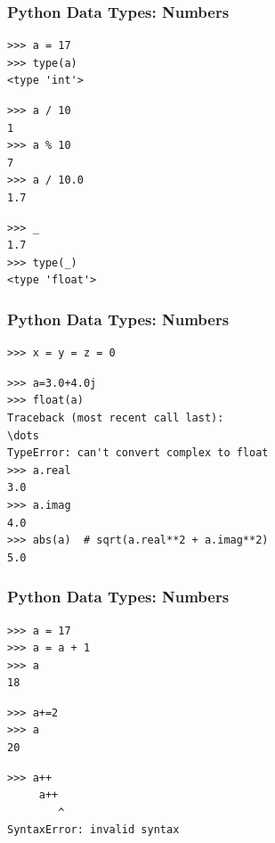 \documentclass[t,10pt,compress=false,usepdftitle=false]{beamer}
\begin{document}
\begin{frame}[fragile]
    \frametitle{Python Data Types: Numbers}
    \begin{myColorBox}{0.9}{}
\begin{verbatim}
>>> a = 17
>>> type(a)
<type 'int'>
\end{verbatim}
    \end{myColorBox}
    \pause
    \begin{myColorBox}{0.9}{}
\begin{verbatim}
>>> a / 10
1
>>> a % 10
7
>>> a / 10.0
1.7
\end{verbatim}
    \end{myColorBox}
    \pause
    \begin{myColorBox}{0.9}{}
\begin{verbatim}
>>> _
1.7
>>> type(_)
<type 'float'>
\end{verbatim}
    \end{myColorBox}
\end{frame}


\begin{frame}[fragile]
    \frametitle{Python Data Types: Numbers}
    \begin{myColorBox}{0.91}{}
\begin{verbatim}
>>> x = y = z = 0
\end{verbatim}
    \end{myColorBox}
    \pause
    \begin{myColorBox}{0.91}{}
\begin{verbatim}
>>> a=3.0+4.0j
>>> float(a)
Traceback (most recent call last):
\dots
TypeError: can't convert complex to float
>>> a.real
3.0
>>> a.imag
4.0
>>> abs(a)  # sqrt(a.real**2 + a.imag**2)
5.0
\end{verbatim}
    \end{myColorBox}
\end{frame}


\begin{frame}[fragile]
    \frametitle{Python Data Types: Numbers}
    \begin{myColorBox}{0.9}{}
\begin{verbatim}
>>> a = 17
>>> a = a + 1
>>> a
18
\end{verbatim}
    \end{myColorBox}
    \pause
    \begin{myColorBox}{0.9}{}
\begin{verbatim}
>>> a+=2
>>> a
20
\end{verbatim}
    \end{myColorBox}
    \pause
    \begin{myColorBox}{0.9}{}
\begin{verbatim}
>>> a++
     a++
        ^
SyntaxError: invalid syntax
\end{verbatim}
    \end{myColorBox}
\end{frame}
\end{document}
